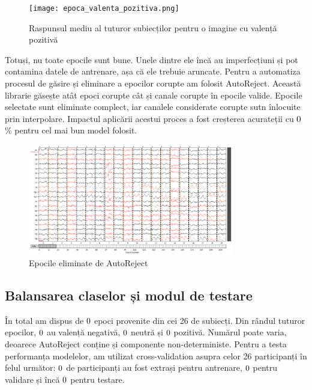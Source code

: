 \setlength{\abovecaptionskip}{0pt}
\setlength{\belowcaptionskip}{0pt}
\clearpage
\begin{figure}
    \centering
    \texttt{[image: epoca\_valenta\_pozitiva.png]}
    \caption{Raspunsul mediu al tuturor subiecților pentru o imagine cu valență pozitivă}
    \label{fig:enter-label}
\end{figure}

Totuși, nu toate epocile sunt bune. Unele dintre ele încă au imperfecțiuni și pot contamina datele de antrenare, așa că ele trebuie aruncate. Pentru a automatiza procesul de găsire și eliminare a epocilor corupte am folosit AutoReject\cite{AutoReject}. Această librarie găsește atât epoci corupte cât și canale corupte în epocile valide. Epocile selectate sunt eliminate complect, iar canalele considerate corupte sutn înlocuite prin interpolare. Impactul aplicării acestui proces a fost creșterea acurateții cu $0$\% pentru cel mai bun model folosit.

\vspace{1em}
\begin{figure}[h]
    \centering
    \includegraphics[width=0.8\textwidth]{images/rezultat_autoreject.png}
    \caption{Epocile eliminate de AutoReject}
    \label{fig:vizualizare_filtru}
\end{figure}

\subsection{Balansarea claselor și modul de testare}

În total am dispus de $0$ epoci provenite din cei 26 de subiecți. Din rândul tuturor epocilor, $0$ au valență negativă, $0$ neutră și $0$ pozitivă. Numărul poate varia, deoarece AutoReject conține și componente non-deterministe. Pentru a testa performanța modelelor, am utilizat cross-validation asupra celor 26 participanți în felul următor: $0$ de participanți au fost extrași pentru antrenare, $0$ pentru validare și încă $0$ pentru testare.

